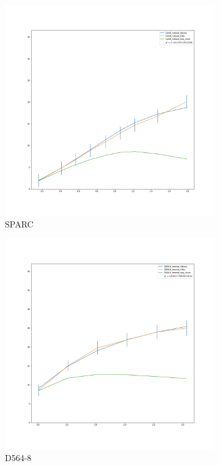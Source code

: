 \documentclass[reprint,%
 amsmath,amssymb,
 aps,
]{revtex4-1}
\begin{document}
 \begin{figure}[h]
\begin{subfigure}{.5\textwidth}
  \centering
  \includegraphics[width=.8\linewidth]{figures/CamB_rotmod_XueSofue.png}
  \caption{SPARC\cite{2016Lelli}}
  \label{fig:sfig1}
\end{subfigure}%
\begin{subfigure}{.5\textwidth}
  \centering
  \includegraphics[width=.8\linewidth]{figures/D564-8_rotmod_XueSofue.png}
  \caption{D564-8}
  \label{fig:sfig2}
\end{subfigure}
\begin{subfigure}{.5\textwidth}

\end{subfigure}
\end{figure}
\end{document}
